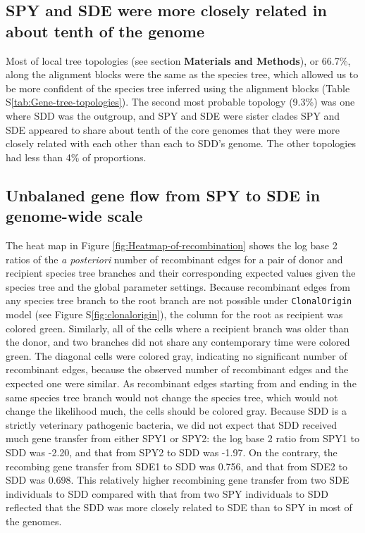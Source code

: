 \documentclass[english]{article}
\begin{document}
\subsection{SPY and SDE were more closely related in about tenth of the genome}

Most of local tree topologies (see section \textbf{Materials and Methods}), 
or 66.7\%, along the alignment blocks were the
same as the species tree, which allowed us to be more confident of the species
tree inferred using the alignment blocks (Table
S\ref{tab:Gene-tree-topologies}).  The second most probable topology (9.3\%)  was one
where SDD was the outgroup, and SPY and SDE were sister clades 
SPY and SDE appeared to share about tenth of the core
genomes that they were more closely related with each other than each to SDD's
genome. The other topologies had less than 4\% of proportions.

\subsection{Unbalaned gene flow from SPY to SDE in genome-wide scale}

The heat map in Figure \ref{fig:Heatmap-of-recombination} shows the log base 2
ratios of the \textit{a posteriori} number of recombinant edges for a pair of
donor and recipient species tree branches and their corresponding expected
values given the species tree and the global parameter settings.  Because
recombinant edges from any species tree branch to the root branch are not
possible under \texttt{ClonalOrigin} model (see Figure S\ref{fig:clonalorigin}),
the column for the root as recipient was colored green. Similarly, all of the
cells where a recipient branch was older than the donor, and two branches did
not share any contemporary time were colored green. The diagonal cells were
colored gray, indicating no significant number of recombinant edges, because the
observed number of recombinant edges and the expected one were similar. As
recombinant edges starting from and ending in the same species tree branch would
not change the species tree, which would not change the likelihood much, the
cells should be colored gray.  Because SDD is a strictly veterinary pathogenic
bacteria, we did not expect that SDD received much gene transfer from either
SPY1 or SPY2: the log base 2 ratio from SPY1 to SDD was -2.20, and that from
SPY2 to SDD was -1.97. On the contrary, the recombing gene transfer from SDE1 to
SDD was 0.756, and that from SDE2 to SDD was 0.698. This relatively higher
recombining gene transfer from two SDE individuals to SDD compared with that
from two SPY individuals to SDD reflected that the SDD was more closely related
to SDE than to SPY in most of the genomes. 
\end{document}

